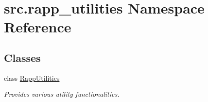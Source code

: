 \hypertarget{namespacesrc_1_1rapp__utilities}{\section{src.\-rapp\-\_\-utilities Namespace Reference}
\label{namespacesrc_1_1rapp__utilities}
}
\subsection*{Classes}
\begin{DoxyCompactItemize}
\item 
class \hyperlink{classsrc_1_1rapp__utilities_1_1RappUtilities}{Rapp\-Utilities}
\begin{DoxyCompactList}\small\item\em Provides various utility functionalities. \end{DoxyCompactList}\end{DoxyCompactItemize}
